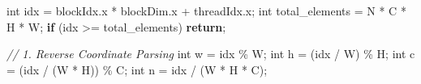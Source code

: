 \documentclass[
  10
]{article}
\newenvironment{Shaded}{}{}
\newcommand{\CommentTok}[1]{\textcolor[rgb]{0.38,0.63,0.69}{\textit{#1}}}
\newcommand{\ControlFlowTok}[1]{\textcolor[rgb]{0.00,0.44,0.13}{\textbf{#1}}}
\newcommand{\DataTypeTok}[1]{\textcolor[rgb]{0.56,0.13,0.00}{#1}}
\newcommand{\NormalTok}[1]{#1}
\newcommand{\OperatorTok}[1]{\textcolor[rgb]{0.40,0.40,0.40}{#1}}
\begin{document}
\begin{Shaded}
\begin{Highlighting}[]
    \DataTypeTok{int}\NormalTok{ idx }\OperatorTok{=}\NormalTok{ blockIdx}\OperatorTok{.}\NormalTok{x }\OperatorTok{*}\NormalTok{ blockDim}\OperatorTok{.}\NormalTok{x }\OperatorTok{+}\NormalTok{ threadIdx}\OperatorTok{.}\NormalTok{x}\OperatorTok{;}
    \DataTypeTok{int}\NormalTok{ total\_elements }\OperatorTok{=}\NormalTok{ N }\OperatorTok{*}\NormalTok{ C }\OperatorTok{*}\NormalTok{ H }\OperatorTok{*}\NormalTok{ W}\OperatorTok{;}
    \ControlFlowTok{if} \OperatorTok{(}\NormalTok{idx }\OperatorTok{\textgreater{}=}\NormalTok{ total\_elements}\OperatorTok{)} \ControlFlowTok{return}\OperatorTok{;}

    \CommentTok{// 1. Reverse Coordinate Parsing}
    \DataTypeTok{int}\NormalTok{ w }\OperatorTok{=}\NormalTok{ idx }\OperatorTok{\%}\NormalTok{ W}\OperatorTok{;}
    \DataTypeTok{int}\NormalTok{ h }\OperatorTok{=} \OperatorTok{(}\NormalTok{idx }\OperatorTok{/}\NormalTok{ W}\OperatorTok{)} \OperatorTok{\%}\NormalTok{ H}\OperatorTok{;}
    \DataTypeTok{int}\NormalTok{ c }\OperatorTok{=} \OperatorTok{(}\NormalTok{idx }\OperatorTok{/} \OperatorTok{(}\NormalTok{W }\OperatorTok{*}\NormalTok{ H}\OperatorTok{))} \OperatorTok{\%}\NormalTok{ C}\OperatorTok{;}
    \DataTypeTok{int}\NormalTok{ n }\OperatorTok{=}\NormalTok{ idx }\OperatorTok{/} \OperatorTok{(}\NormalTok{W }\OperatorTok{*}\NormalTok{ H }\OperatorTok{*}\NormalTok{ C}\OperatorTok{);} 
\end{Highlighting}
\end{Shaded}
\end{document}
